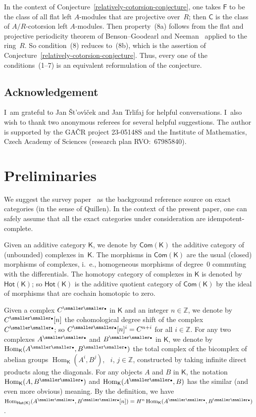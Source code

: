 \documentclass[12pt,a4paper]{amsart}
\newcommand{\+}{\nobreakdash-}
\renewcommand{\:}{\colon}
\newcommand{\bu}{{\text{\smaller\smaller$\scriptstyle\bullet$}}}
\DeclareMathOperator{\Hom}{Hom}
\newcommand{\sC}{\mathsf C}
\newcommand{\sF}{\mathsf F}
\newcommand{\sK}{\mathsf K}
\newcommand{\Hot}{\mathsf{Hot}}
\newcommand{\Com}{\mathsf{Com}}
\newcommand{\boZ}{\mathbb Z}
\newcommand{\Section}[1]{\bigskip\section{#1}\medskip}
\theoremstyle{plain}
\theoremstyle{definition}
\begin{document}
 In the context of Conjecture~\ref{relatively-cotorsion-conjecture},
one takes $\sF$ to be the class of all flat left $A$\+modules that are
projective over~$R$; then $\sC$ is the class of $A/R$\+cotorsion
left $A$\+modules.
 Then property~(8a) follows from the flat and projective periodicity
theorem of Benson--Goodearl and Neeman~\cite{BG,Neem} applied to
the ring~$R$.
 So condition~(8) reduces to~(8b), which is the assertion of
Conjecture~\ref{relatively-cotorsion-conjecture}.
 Thus, every one of the conditions~(1\+-7) is an equivalent 
reformulation of the conjecture.

\subsection*{Acknowledgement}
 I~am grateful to Jan \v St\!'ov\'\i\v cek and Jan Trlifaj for helpful
conversations.
 I~also wish to thank two anonymous referees for several helpful
suggestions.
 The author is supported by the GA\v CR project 23-05148S
and the Institute of Mathematics, Czech Academy of Sciences
(research plan RVO:~67985840).


\Section{Preliminaries}  \label{preliminaries-secn}

 We suggest the survey paper~\cite{Bueh} as the background reference
source on exact categories (in the sense of Quillen).
 In the context of the present paper, one can safely assume that all
the exact categories under consideration are idempotent-complete.

 Given an additive category $\sK$, we denote by $\Com(\sK)$ the additive
category of (unbounded) complexes in~$\sK$.
 The morphisms in $\Com(\sK)$ are the usual (closed) morphisms of
complexes, i.~e., homogeneous morphisms of degree~$0$ commuting with
the differentials.
 The homotopy category of complexes in $\sK$ is denoted by $\Hot(\sK)$;
so $\Hot(\sK)$ is the additive quotient category of $\Com(\sK)$ by
the ideal of morphisms that are cochain homotopic to zero.

 Given a complex $C^\bu$ in $\sK$ and an integer $n\in\boZ$, we denote
by $C^\bu[n]$ the cohomological degree shift of the complex~$C^\bu$;
so $C^\bu[n]^i=C^{n+i}$ for all $i\in\boZ$.
 For any two complexes $A^\bu$ and $B^\bu$ in $\sK$, we denote by
$\Hom_\sK(A^\bu,B^\bu)$ the total complex of the bicomplex of abelian
groups $\Hom_\sK(A^i,B^j)$, \ $i$, $j\in\boZ$, constructed by taking
infinite direct products along the diagonals.
 For any objects $A$ and $B$ in $\sK$, the notation $\Hom_\sK(A,B^\bu)$
and $\Hom_\sK(A^\bu,B)$ has the similar (and even more obvious) meaning.
 By the definition, we have $\Hom_{\Hot(\sK)}(A^\bu,B^\bu[n])=
H^n\Hom_\sK(A^\bu,B^\bu)$.
\end{document}
